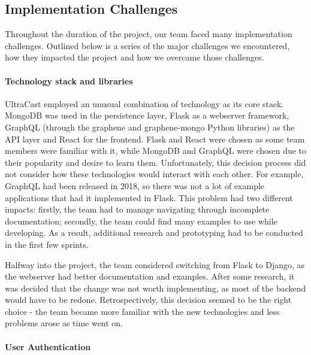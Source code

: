 \documentclass[../report.tex]{subfiles}
\begin{document}
\subsection{Implementation Challenges} \label{ssec:backend_challenges}

Throughout the duration of the project, our team faced many implementation challenges.
Outlined below is a series of the major challenges we encountered, how they impacted the project and how we overcame those challenges.

\paragraph{Technology stack and libraries}

UltraCast employed an unusual combination of technology as its core stack.
MongoDB was used in the persistence layer, Flask as a webserver framework, GraphQL (through the graphene and graphene-mongo Python libraries) as the API layer and React for the frontend.
Flask and React were chosen as some team members were familiar with it, while MongoDB and GraphQL were chosen due to their popularity and desire to learn them.
Unfortunately, this decision process did not consider how these technologies would interact with each other.
For example, GraphQL had been released in 2018, so there was not a lot of example applications that had it implemented in Flask.
This problem had two different impacts: firstly, the team had to manage navigating through incomplete documentation; secondly, the team could find many examples to use while developing.
As a result, additional research and prototyping had to be conducted in the first few sprints.

Halfway into the project, the team considered switching from Flask to Django, as the webserver had better documentation and examples.
After some research, it was decided that the change was not worth implementing, as most of the backend would have to be redone.
Retrospectively, this decision seemed to be the right choice - the team became more familiar with the new technologies and less problems arose as time went on.

\paragraph{User Authentication}
\end{document}
